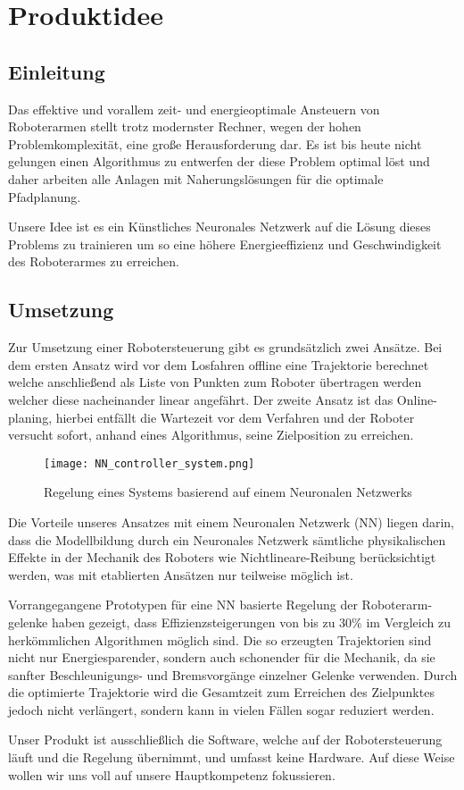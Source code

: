 \chapter{Produktidee}

\section{Einleitung}

Das effektive und vorallem zeit- und energieoptimale Ansteuern von Roboterarmen stellt trotz modernster Rechner, wegen der hohen Problemkomplexität, eine große Herausforderung dar. Es ist bis heute nicht gelungen einen Algorithmus zu entwerfen der diese Problem optimal löst und daher arbeiten alle Anlagen mit Naherungslösungen für die optimale Pfadplanung.

Unsere Idee ist es ein Künstliches Neuronales Netzwerk auf die Lösung dieses Problems zu trainieren um so eine höhere Energieeffizienz und Geschwindigkeit des Roboterarmes zu erreichen.

\section{Umsetzung}

Zur Umsetzung einer Robotersteuerung gibt es grundsätzlich zwei Ansätze. Bei dem ersten Ansatz wird vor dem Losfahren offline eine Trajektorie berechnet welche anschließend als Liste von Punkten zum Roboter übertragen werden welcher diese nacheinander linear angefährt. Der zweite Ansatz ist das Online-planing, hierbei entfällt die Wartezeit vor dem Verfahren und der Roboter versucht sofort, anhand eines Algorithmus, seine Zielposition zu erreichen. 

\begin{figure}[h]
	\centering
	\texttt{[image: NN\_controller\_system.png]}
	\caption{Regelung eines Systems basierend auf einem Neuronalen Netzwerks}
	\label{fig:NeuralNetworkControlSystem}
\end{figure}

Die Vorteile unseres Ansatzes mit einem Neuronalen Netzwerk (NN) liegen darin, dass die Modellbildung durch ein Neuronales Netzwerk sämtliche physikalischen Effekte in der Mechanik des Roboters wie Nichtlineare-Reibung berücksichtigt werden, was mit etablierten Ansätzen nur teilweise möglich ist.

Vorrangegangene Prototypen für eine NN basierte Regelung der Roboterarm-gelenke haben gezeigt, dass Effizienzsteigerungen von bis zu 30\% im Vergleich zu herkömmlichen Algorithmen möglich sind. Die so erzeugten Trajektorien sind nicht nur Energiesparender, sondern auch schonender für die Mechanik, da sie sanfter Beschleunigungs- und Bremsvorgänge  einzelner Gelenke verwenden. Durch die optimierte Trajektorie wird die Gesamtzeit zum Erreichen des Zielpunktes jedoch nicht verlängert, sondern kann in vielen Fällen sogar reduziert werden.

Unser Produkt ist ausschließlich die Software, welche auf der Robotersteuerung läuft und die Regelung übernimmt, und umfasst keine Hardware. Auf diese Weise wollen wir uns voll auf unsere Hauptkompetenz fokussieren.

